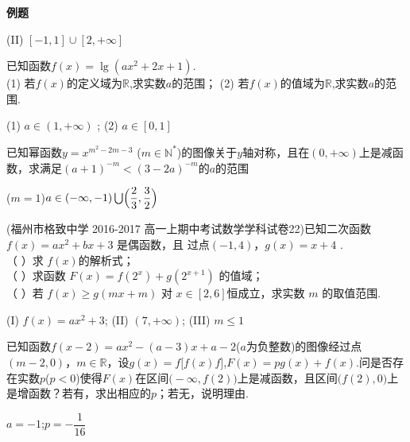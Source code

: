 \begin{exercise}{\large \bf 例\hspace{0.6em}题}
\begin{answer}
       (II) $[-1,1]\cup[2,+\infty] $
      \end{answer}
    \vspace{12em}
    \item%
      已知函数$f(x)=\lg(ax^2+2x+1) $.\\
      (1) 若$f(x)$的定义域为$\mathbb{R}$,求实数$a$的范围；
      (2) 若$f(x)$的值域为$\mathbb{R}$,求实数$a$的范围.
      \begin{answer}
      (1) $a\in(1,+\infty)$ ;
      (2) $a\in[0,1] $
      \end{answer}
    \vspace{12em}
    \item%
      已知幂函数$y=x^{m^2-2m-3} $ ($m\in \mathbb{N}^* $)的图像关于$y$轴对称，且在$(0,+\infty) $上是减函数，求满足$(a+1)^{-m}<(3-2a)^{-m} $的$a$的范围
      \begin{answer}
      ($m=1$)$a\in (-\infty,-1)\bigcup\Bigl(\dfrac23,\dfrac32\Bigr)$
      \end{answer}
      \vspace{12em}
    \item%
      (福州市格致中学 2016-2017 高一上期中考试数学学科试卷22)已知二次函数 $f ( x )= ax^2+ bx+3$ 是偶函数，且 过点$(-1,4)$，$ g ( x )= x + 4$ .\\
      （ ）求 $f (x) $的解析式；\\
      （ ）求函数 $F ( x )= f (2^x )+ g (2^{x+1} )$ 的值域； \\
      （ ）若 $f ( x ) \geq g ( mx +m )$ 对 $x\in [2, 6] $恒成立，求实数 $m$ 的取值范围.\\
      \begin{answer}
      (I) $f(x)=ax^2+3$; (II) $(7,+\infty)$; (III) $m\leq1$
      \end{answer}
    \vspace{13em}
    \item%
      已知函数$f(x-2)=ax^2-(a-3)x+a-2$($a$为负整数)的图像经过点 $(m-2,0) $，$m\in \mathbb{R}$，设$g(x)=f\bigl[f(x)f\bigr] $,$F(x)=pg(x)+f(x)$.问是否存在实数$p$($p<0$)使得$F(x)$在区间$\bigl(-\infty,f(2)\bigr) $上是减函数，且区间$\bigl(f(2),0\bigr)$上是增函数？若有，求出相应的$p$；若无，说明理由.\\
      \begin{answer}
      $a=-1$;$p=-\dfrac{1}{16}$
      \end{answer}
    \vspace{15em}

\end{exercise}
